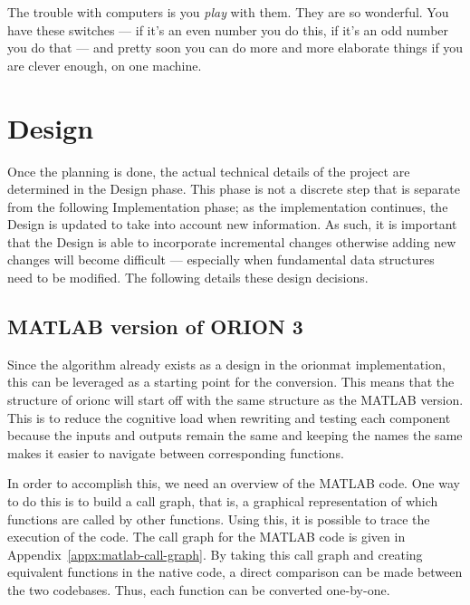 \begin{savequote}[0.55\linewidth]
	\begin{fancyquote}
		The trouble with computers is you \emph{play} with them. They are so
		wonderful. You have these switches --- if it's an even number you do
		this, if it's an odd number you do that --- and pretty soon you can
		do more and more elaborate things if you are clever enough, on one
		machine.
	\end{fancyquote}
\end{savequote}
\chapter{Design}\label{ch:design}

Once the planning is done, the actual technical details of the
project are determined in the Design phase. This phase is not a
discrete step that is separate from the following Implementation
phase; as the implementation continues, the Design is updated to
take into account new information. As such, it is important that
the Design is able to incorporate incremental changes otherwise
adding new changes will become difficult --- especially
when fundamental data structures need to be modified. The following
details these design decisions.

\section{MATLAB version of ORION 3}

Since the algorithm already exists as a design in the \gls{orionmat}
implementation, this can be leveraged as a starting point for the
conversion. This means that the structure of \gls{orionc} will
start off with the same structure as the MATLAB version. This is
to reduce the cognitive load when rewriting and testing each
component because the inputs and outputs remain the same and
keeping the names the same makes it easier to navigate between
corresponding functions.

In order to accomplish this, we need an overview of the MATLAB
code. One way to do this is to build a call graph, that is, a
graphical representation of which functions are called by other
functions. Using this, it is possible to trace the execution of
the code. The call graph for the MATLAB code is given in
Appendix~\ref{appx:matlab-call-graph}. By taking this call graph
and creating equivalent functions in the native code, a direct
comparison can be made between the two codebases. Thus, each
function can be converted one-by-one.

